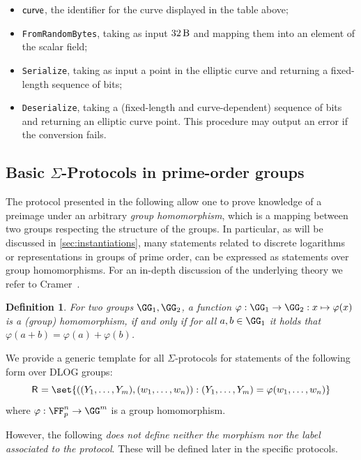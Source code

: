 \documentclass[11pt]{article}
\newtheorem{definition}{Definition}
\begin{document}
\begin{itemize}
  \item $\textsf{curve}$, the identifier for the curve displayed in the table above;
  \item \texttt{FromRandomBytes}, taking as input $\seedlen$ and mapping them into an element of the scalar field;
  \item \texttt{Serialize}, taking as input a point in the elliptic curve and returning a fixed-length sequence of bits;
  \item \texttt{Deserialize}, taking a (fixed-length and curve-dependent) sequence of bits and returning an elliptic curve point. This procedure may output an error if the conversion fails.
\end{itemize}


\subsection{Basic $\Sigma$-Protocols in prime-order groups}

The protocol presented in the following allow one to prove knowledge of a preimage under an arbitrary \emph{group homomorphism}, which is a mapping between two groups respecting the structure of the groups.
In particular, as will be discussed in \cref{sec:instantiations}, many statements related to discrete logarithms or representations in groups of prime order, can be expressed as statements over group homomorphisms.
For an in-depth discussion of the underlying theory we refer to Cramer~\cite{cramer97}.

\begin{definition}
  For two groups $\GG_1,\GG_2$, a function $\varphi:\GG_1\to\GG_2:x\mapsto\varphi(x)$ is a \emph{(group) homomorphism}, if and only if for all $a,b\in\GG_1$ it holds that $\varphi(a+b)=\varphi(a)+\varphi(b)$.
\end{definition}




\label{sec:sigma-dlog}
We provide a generic template for all $\Sigma$-protocols for statements of the following form over DLOG groups:
\[
  \relation=\set{((\statement_1,\dots,\statement_m),(w_1,\dots,w_n)) : (\statement_1,\dots,\statement_m)=\varphi(w_1,\dots,w_n)}
\]
where $\varphi:\FF_p^n\to\GG^m$ is a group homomorphism.

However, the following \emph{does not define neither the morphism nor the label associated to the protocol}.
These will be defined later in the specific protocols.
\end{document}
